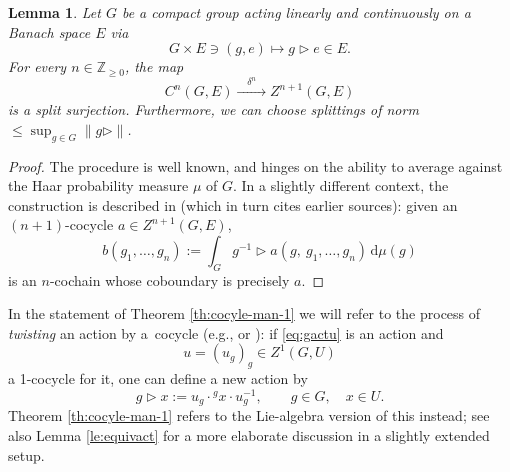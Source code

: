 \documentclass[pdftex]{sigma}
\numberwithin{equation}{section}
\newtheorem{Lemma}[Theorem]{Lemma}
\newcommand\bZ{{\mathbb Z}}
\begin{document}
\begin{Lemma}\label{le:cansplit}
 Let $G$ be a compact group acting linearly and continuously on a Banach space $E$ via
 \begin{equation*}
 G\times E\ni (g,e)\mapsto g\triangleright e\in E.
 \end{equation*}
 For every $n\in \bZ_{\ge 0}$, the map
 \begin{equation*}%
 C^n(G,E)\xrightarrow{\quad\delta^n\quad} Z^{n+1}(G,E)
 \end{equation*}
 is a split surjection. Furthermore, we can choose splittings of norm $\le \sup_{g\in G}\|g\triangleright\|$.
\end{Lemma}
\begin{proof}
 The procedure is well known, and hinges on the ability to average against the Haar probability measure $\mu$ of $G$. In a slightly different context, the construction is described in \cite[Proof of Theorem~2.3]{moo-12} (which in turn cites earlier sources): given an $(n+1)$-cocycle ${a\in Z^{n+1}(G,E)}$,
 \begin{equation}\label{eq:splitgpcoc}
 b(g_1,\dots,g_{n}):=\int_{G}g^{-1}\triangleright a(g,\ g_1,\dots,g_n)\, \mathrm{d}\mu(g)
 \end{equation}
 is an $n$-cochain whose coboundary is precisely $a$.
\end{proof}

In the statement of Theorem \ref{th:cocyle-man-1} we will refer to the process of {\it twisting} an action by a~cocycle (e.g., \cite[Section~I.5.3, Example 2 preceding Proposition 34]{ser-gal} or \cite[Definition X.1.4, equation~(8)]{tak2}): if \eqref{eq:gactu} is an action and
\begin{equation*}
 u = (u_g)_g\in Z^1(G,U)
\end{equation*}
a 1-cocycle for it, one can define a new action by
\begin{equation*}
 g\triangleright x := u_g \cdot {}^g x \cdot u_g^{-1},\qquad g\in G,\quad x\in U.
\end{equation*}
Theorem \ref{th:cocyle-man-1} refers to the Lie-algebra version of this instead; see also Lemma \ref{le:equivact} for a more elaborate discussion in a slightly extended setup.
\end{document}
